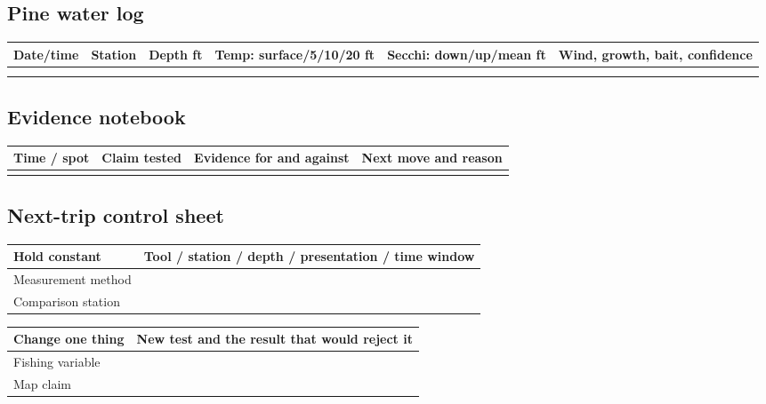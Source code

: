 \subsection{Pine water log}
\renewcommand{\arraystretch}{1.35}
\begin{tabularx}{\linewidth}{@{}p{.11\linewidth}p{.11\linewidth}p{.09\linewidth}
p{.15\linewidth}p{.15\linewidth}X@{}}
\toprule
Date/time & Station & Depth ft & Temp: surface/5/10/20 ft &
Secchi: down/up/mean ft & Wind, growth, bait, confidence\\
\midrule
\rule{0pt}{.8cm}&&&&&\\ \midrule
\rule{0pt}{.8cm}&&&&&\\
\bottomrule
\end{tabularx}
\renewcommand{\arraystretch}{1}

\subsection{Evidence notebook}
\begin{tabularx}{\linewidth}{@{}p{.13\linewidth}p{.18\linewidth}X X@{}}
\toprule
Time / spot & Claim tested & Evidence for and against & Next move and reason\\
\midrule
\rule{0pt}{.8cm}&&&\\
\bottomrule
\end{tabularx}

\subsection{Next-trip control sheet}
\begin{tabularx}{\linewidth}{@{}p{.22\linewidth}X@{}}
\toprule
\textbf{Hold constant} & Tool / station / depth / presentation / time window\\
\midrule
Measurement method & \rule{0pt}{.7cm}\\ \midrule
Comparison station & \rule{0pt}{.7cm}\\
\bottomrule
\end{tabularx}
\vspace{.65em}
\begin{tabularx}{\linewidth}{@{}p{.22\linewidth}X@{}}
\toprule
\textbf{Change one thing} & New test and the result that would reject it\\
\midrule
Fishing variable & \rule{0pt}{.7cm}\\ \midrule
Map claim & \rule{0pt}{.7cm}\\
\bottomrule
\end{tabularx}



